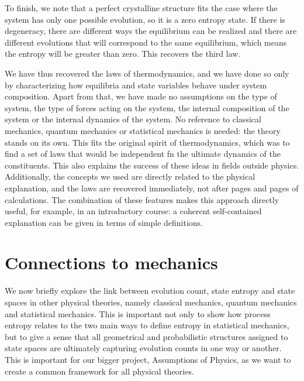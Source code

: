 \documentclass[letterpaper,twocolumn]{article}
\begin{document}
To finish, we note that a perfect crystalline structure fits the case where the system has only one possible evolution, so it is a zero entropy state. If there is degeneracy, there are different ways the equilibrium can be realized and there are different evolutions that will correspond to the same equilibrium, which means the entropy will be greater than zero. This recovers the third law.

We have thus recovered the laws of thermodynamics, and we have done so only by characterizing how equilibria and state variables behave under system composition. Apart from that, we have made no assumptions on the type of system, the type of forces acting on the system, the internal composition of the system or the internal dynamics of the system. No reference to classical mechanics, quantum mechanics or statistical mechanics is needed: the theory stands on its own. This fits the original spirit of thermodynamics, which was to find a set of laws that would be independent fn the ultimate dynamics of the constituents. This also explains the success of these ideas in fields outside physics. Additionally, the concepts we used are directly related to the physical explanation, and the laws are recovered immediately, not after pages and pages of calculations. The combination of these features makes this approach directly useful, for example, in an introductory  course: a coherent self-contained explanation can be given in terms of simple definitions.

\section{Connections to mechanics}\label{sec_mechanics}

We now briefly explore the link between evolution count, state entropy and state spaces in other physical theories, namely classical mechanics, quantum mechanics and statistical mechanics. This is important not only to show how process entropy relates to the two main ways to define entropy in statistical mechanics, but to give a sense that all geometrical and probabilistic structures assigned to state spaces are ultimately capturing evolution counts in one way or another. This is important for our bigger project, Assumptions of Physics, as we want to create a common framework for all physical theories.
\end{document}
